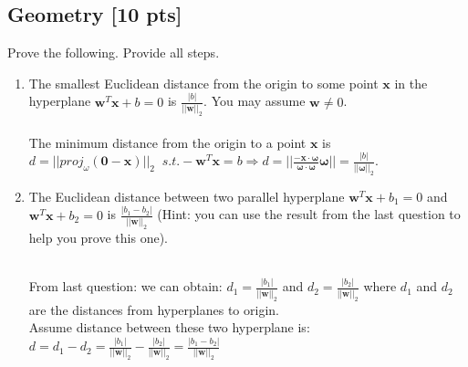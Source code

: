 \documentclass[a4paper]{article}
\theoremstyle{definition}
\newenvironment{soln}{
	\leavevmode\color{blue}\ignorespaces
}{}
\begin{document}
	\subsection{Geometry [10 pts]}
	Prove the following.  Provide all steps.
	\begin{enumerate}
		\item 	The smallest Euclidean distance from the origin to some point $\mathbf{x}$ in the hyperplane $\mathbf{w}^{T}\mathbf{x} + b = 0$ is $\frac{|b|}{||\mathbf{w}||_2}$.  You may assume $\mathbf{w} \neq 0$.\\
		\begin{soln}\\
		The minimum distance from the origin to a point $\mathbf{x}$ is $d = ||proj_\omega \mathbf{(0 - x)}||_2 \;\; s.t. -\mathbf{w}^{T}\mathbf{x} = b  \Rightarrow d = ||\frac{-\mathbf x \cdot \mathbf{\omega}}{\mathbf\omega \cdot \mathbf\omega} \mathbf\omega|| = \frac{|b|}{||\mathbf{\omega}||_2}$.\\
		\end{soln}
		
		\item 	The Euclidean distance between two parallel hyperplane $\mathbf{w}^{T}\mathbf{x} + b_1 = 0$ and $\mathbf{w}^{T}\mathbf{x} + b_2 = 0$ is $\frac{|b_1 - b_2|}{||\mathbf{w}||_2}$ (Hint: you can use the result from the last question to help you prove this one).
		
		\begin{soln}\\
		From last question: we can obtain: $d_1 = \frac{|b_1|}{||\mathbf{w}||_2}$ and $d_2 = \frac{|b_2|}{||\mathbf{w}||_2}$ where $d_1$ and $d_2$ are the distances from hyperplanes to origin.\\
		Assume distance between these two hyperplane is: $d = d_1 - d_2 = \frac{|b_1|}{||\mathbf{w}||_2} - \frac{|b_2|}{||\mathbf{w}||_2} = \frac{|b_1 - b_2|}{||\mathbf{w}||_2}$\\
		\end{soln}
		
	\end{enumerate}
	
	
	
\end{document}
